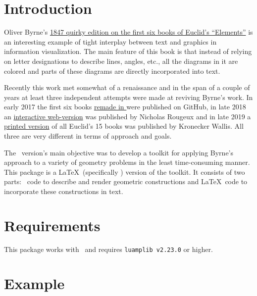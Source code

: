 \section{Introduction}
Oliver Byrne's \href{https://archive.org/details/firstsixbooksofe00byrn/}{1847 quirky edition on the first six books of Euclid's ``Elements''}\cite{Byrne1847} is an interesting example of tight interplay between text and graphics in information visualization. The main feature of this book is that instead of relying on letter designations to describe lines, angles, etc., all the diagrams in it are colored and parts of these diagrams are directly incorporated into text.

Recently this work met somewhat of a renaissance and in the span of a couple of years at least three independent attempts were made at reviving Byrne's work. In early 2017 the first six books \href{https://github.com/jemmybutton/byrne-euclid/}{remade in \ConTeXt} were published on GitHub\cite{Slyusarev2017}, in late 2018 an \href{https://www.c82.net/euclid/}{interactive web-version} was published by Nicholas Rougeux\cite{Rougeux2018} and in late 2019 a \href{https://www.kroneckerwallis.com/product/euclids-elements-completing-oliver-byrnes-work/}{printed version} of all Euclid's 15 books was published by Kronecker Wallis. All three are very different in terms of approach and goals.

The \ConTeXt\ version's main objective was to develop a toolkit for applying Byrne's approach to a variety of geometry problems in the least time-consuming manner. This package is a \LaTeX\ (specifically \LuaLaTeX) version of the toolkit. It consists of two parts: \METAPOST\ code to describe and render geometric constructions and \LaTeX\ code to incorporate these constructions in text.

\section{Requirements}

This package works with \LuaLaTeX\ and requires \texttt{luamplib v2.23.0} or higher.
\section{Example}

